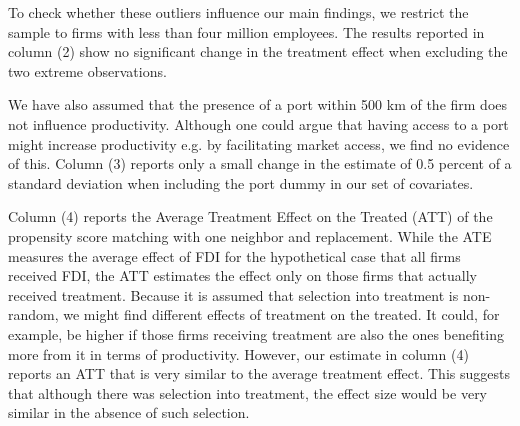 \documentclass[a4paper,11pt]{scrartcl}
\begin{document}
To check whether these outliers influence our main findings, we restrict the sample to firms with less than four million employees. The results reported in column (2) show no significant change in the treatment effect when excluding the two extreme observations. 

We have also assumed that the presence of a port within 500 km of the firm does not influence productivity. Although one could argue that having access to a port might increase productivity e.g. by facilitating market access, we find no evidence of this.  Column (3) reports only a small change in the estimate of 0.5 percent of a standard deviation when including the port dummy in our set of covariates. 

Column (4) reports the Average Treatment Effect on the Treated (ATT) of the propensity score matching with one neighbor and replacement. While the ATE measures the average effect of FDI for the hypothetical case that all firms received FDI, the ATT estimates the effect only on those firms that actually received treatment. Because it is assumed that selection into treatment is non-random, we might find different effects of treatment on the treated. 
It could, for example, be higher if those firms receiving treatment are also the ones benefiting more from it in terms of productivity. %
 However, our estimate in column (4) reports an ATT that is very similar to the average treatment effect. This suggests that although there was selection into treatment, the effect size would be very similar in the absence of such selection. %
 
\end{document}
